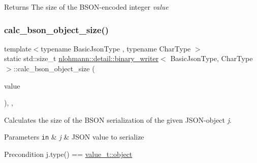 \begin{DoxyReturn}{Returns}
The size of the B\+S\+O\+N-\/encoded integer {\itshape value} 
\end{DoxyReturn}
\mbox{\label{classnlohmann_1_1detail_1_1binary__writer_acc6f1cc1fd370ee84ebc8cf7b8712840}} 
\subsubsection{\texorpdfstring{calc\+\_\+bson\+\_\+object\+\_\+size()}{calc\_bson\_object\_size()}}
{\footnotesize\ttfamily template$<$typename Basic\+Json\+Type , typename Char\+Type $>$ \\
static std\+::size\+\_\+t \mbox{\hyperlink{classnlohmann_1_1detail_1_1binary__writer}{nlohmann\+::detail\+::binary\+\_\+writer}}$<$ Basic\+Json\+Type, Char\+Type $>$\+::calc\+\_\+bson\+\_\+object\+\_\+size (\begin{DoxyParamCaption}\item[{const typename Basic\+Json\+Type\+::object\+\_\+t \&}]{value }\end{DoxyParamCaption})\hspace{0.3cm}{\ttfamily [inline]}, {\ttfamily [static]}, {\ttfamily [private]}}



Calculates the size of the B\+S\+ON serialization of the given J\+S\+O\+N-\/object {\itshape j}. 


\begin{DoxyParams}[1]{Parameters}
\mbox{\tt in}  & {\em j} & J\+S\+ON value to serialize \\
\hline
\end{DoxyParams}
\begin{DoxyPrecond}{Precondition}
j.\+type() == \mbox{\hyperlink{namespacenlohmann_1_1detail_a1ed8fc6239da25abcaf681d30ace4985aa8cfde6331bd59eb2ac96f8911c4b666}{value\+\_\+t\+::object}} 
\end{DoxyPrecond}
\mbox{\label{classnlohmann_1_1detail_1_1binary__writer_aea44fd97a5cb9b4f175e66e3e4fdf158}} 
